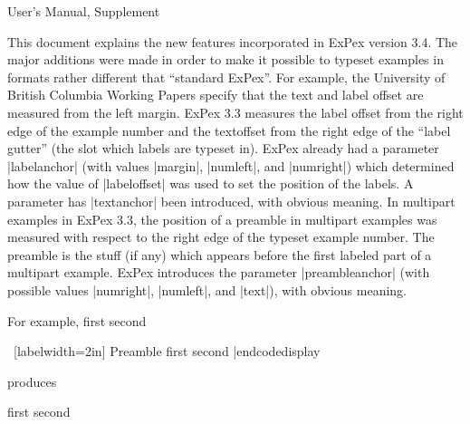 
\centerline{ User's Manual, Supplement}
\hfil

\noindent This document explains the new features incorporated in
ExPex version 3.4.  The major additions were made in order to
make it possible to typeset examples in formats rather different
that ``standard ExPex''.  For example, the University of British
Columbia Working Papers specify that the text and label offset
are measured from the left margin.  ExPex 3.3 measures the label
offset from the right edge of the example number and the
textoffset from the right edge of the ``label gutter'' (the slot
which labels are typeset in). ExPex already had a parameter
|labelanchor| (with values |margin|, |numleft|, and |numright|)
which determined how the value of |labeloffset| was used to set
the position of the labels. A parameter has |textanchor| been
introduced, with obvious meaning.  In multipart examples in ExPex
3.3, the position of a preamble in multipart examples was
measured with respect to the right edge of the typeset example
number.  The preamble is the stuff (if any) which appears before
the first labeled part of a multipart example.  ExPex introduces
the parameter |preambleanchor| (with possible values |numright|,
|numleft|, and |text|), with obvious meaning.

For example,
\begingroup
\codedisplay
{}
\pex[exno=137]
\a first
\a second
\xe

\pex~[labelwidth=2in]
Preamble
\a first
\a[label=bb] second
\xe
|endcodedisplay

\noindent produces

\pex[exno=137]
\a first
\a second
\xe

